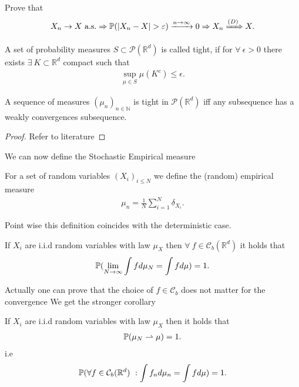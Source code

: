 \begin{exercise}
 Prove that 
 \begin{align*}
   X_n \to  X \ \text{a.s.} \implies \P(\abs{X_n - X} > \epsilon ) \xrightarrow{n\to \infty} 0 \implies X_n \xRightarrow{(D)} X
 .\end{align*}
\end{exercise}
\begin{definition}[Tightness]
 A set of probability measures $S \subset  \mathcal{P}(\mathbb{R}^{d} )$  is called tight, if 
 for $\forall \ \epsilon  > 0$ there exists $\exists \  K \subset  \mathbb{R}^{d} $ compact such that 
 \begin{align*}
   \sup_{\mu  \in  S} \mu(K^{c} )  \le  \epsilon 
 .\end{align*}
\end{definition}
\begin{theorem}
  A sequence of measures $(\mu_n)_{n \in  \mathbb{N}}$  is tight in $\mathcal{P}(\mathbb{R}^{d} )$ iff 
  any subsequence has a weakly convergences subsequence.
\end{theorem}
\begin{proof}
 Refer to literature 
\end{proof}
We can now define the Stochastic Empirical measure  
\begin{definition}
  For a set of  random variables $(X_i)_{i\le N}$  we define the (random) empirical measure 
  \begin{align*}
    \mu_n = \frac{1}{N}\sum_{i=1}^{N} \delta_{X_i} 
  .\end{align*}
\end{definition}
Point wise this definition coincides with the deterministic case.
\begin{corollary}
  If  $X_i$ are i.i.d random variables with law $\mu_{X}$ then  $\forall  \ f \in  \mathcal{C}_b(\mathbb{R}^{d} ) $ it holds that
  \begin{align*}
    \P(\lim_{N \to \infty} \int  f d \mu_N = \int f d\mu ) = 1
  .\end{align*}
\end{corollary}
Actually one can prove that the choice of $f \in  \mathcal{C}_b$ does not matter for the convergence 
We get the stronger corollary
\begin{corollary}
  If  $X_i$ are i.i.d random variables with law $\mu_{X}$ then  it holds that
\begin{align*}
  \P(\mu_N \rightharpoonup \mu ) = 1
.\end{align*}
i.e 
\begin{align*}
 \P( \forall  f \in  \mathcal{C}_b(\mathbb{R}^{d} ) \ : \int f_n d\mu_n = \int  f d\mu )  = 1
.\end{align*}
\end{corollary}

